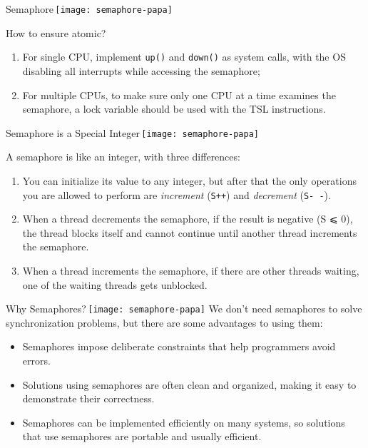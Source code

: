 \begin{frame}{Semaphore\,\texttt{[image: semaphore-papa]}}%
\begin{block}{How to ensure atomic?}
  \begin{enumerate}
  \item For single CPU, implement \texttt{up()} and \texttt{down()} as system calls, with the
    OS disabling all interrupts while accessing the semaphore;
  \item For multiple CPUs, to make sure only one CPU at a time examines the semaphore, a lock
    variable should be used with the TSL instructions.
  \end{enumerate}
\end{block}
\end{frame}

\begin{frame}{Semaphore is a Special Integer\,\texttt{[image: semaphore-papa]}}
  \begin{block}{A semaphore is like an integer, with three differences:}
    \begin{enumerate}
    \item You can initialize its value to any integer, but after that the only operations
      you are allowed to perform are \emph{increment} (\texttt{S++}) and \emph{decrement}
      (\texttt{S-\,-}).
    \item When a thread decrements the semaphore, if the result is negative (S ⩽ 0), the
      thread blocks itself and cannot continue until another thread increments the
      semaphore.
    \item When a thread increments the semaphore, if there are other threads waiting, one
      of the waiting threads gets unblocked.
    \end{enumerate}
  \end{block}
\end{frame}

\begin{frame}{Why Semaphores?\,\texttt{[image: semaphore-papa]}}
  We don't need semaphores to solve synchronization problems, but there are some advantages to using
  them:
  \begin{itemize}
  \item Semaphores impose deliberate constraints that help programmers avoid errors.
  \item Solutions using semaphores are often clean and organized, making it easy to demonstrate
    their correctness.
  \item Semaphores can be implemented efficiently on many systems, so solutions that use semaphores
    are portable and usually efficient.
  \end{itemize}
\end{frame}

